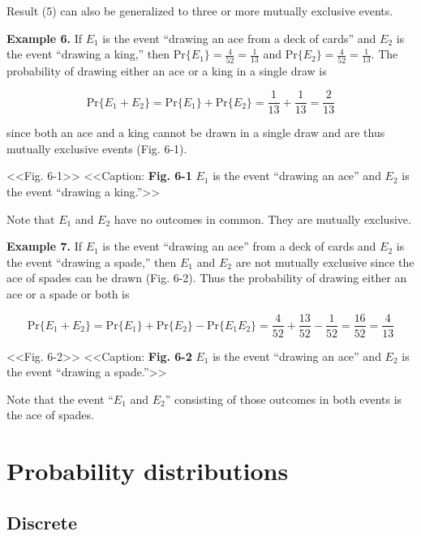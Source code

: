 \documentclass[
]{article}
\begin{document}
Result (5) can also be generalized to three or more mutually exclusive
events.

\textbf{Example 6.} If \(E_1\) is the event ``drawing an ace from a deck
of cards'' and \(E_2\) is the event ``drawing a king,'' then
\(\text{Pr}\{E_1\} = \frac{4}{52} = \frac{1}{13}\) and
\(\text{Pr}\{E_2\} = \frac{4}{52} = \frac{1}{13}\). The probability of
drawing either an ace or a king in a single draw is

\[
\text{Pr}\{E_1 + E_2\} = \text{Pr}\{E_1\} + \text{Pr}\{E_2\}
  = \frac{1}{13} + \frac{1}{13} = \frac{2}{13}
\]

since both an ace and a king cannot be drawn in a single draw and are
thus mutually exclusive events (Fig. 6-1).

\textless\textless Fig. 6-1\textgreater\textgreater{}
\textless\textless Caption: \textbf{Fig. 6-1} \(E_1\) is the event
``drawing an ace'' and \(E_2\) is the event ``drawing a
king.''\textgreater\textgreater{}

Note that \(E_1\) and \(E_2\) have no outcomes in common. They are
mutually exclusive.

\textbf{Example 7.} If \(E_1\) is the event ``drawing an ace'' from a
deck of cards and \(E_2\) is the event ``drawing a spade,'' then \(E_1\)
and \(E_2\) are not mutually exclusive since the ace of spades can be
drawn (Fig. 6-2). Thus the probability of drawing either an ace or a
spade or both is

\[
\text{Pr}\{E_1 + E_2 \} = \text{Pr}\{E_1\} + \text{Pr}\{E_2\}
  - \text{Pr}\{E_1 E_2\} = \frac{4}{52} + \frac{13}{52} - \frac{1}{52}
  = \frac{16}{52} = \frac{4}{13}
\]

\textless\textless Fig. 6-2\textgreater\textgreater{}
\textless\textless Caption: \textbf{Fig. 6-2} \(E_1\) is the event
``drawing an ace'' and \(E_2\) is the event ``drawing a
spade.''\textgreater\textgreater{}

Note that the event ``\(E_1\) and \(E_2\)'' consisting of those outcomes
in both events is the ace of spades.

\hypertarget{probability-distributions}{%
\section{Probability distributions}\label{probability-distributions}}

\hypertarget{discrete}{%
\subsection{Discrete}\label{discrete}}
\end{document}
